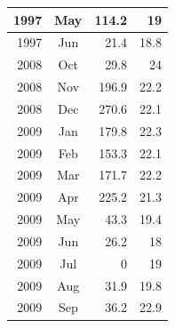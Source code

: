 \documentclass[11pt]{article}
\begin{document}
\begin{table}[]
{\begin{tabular}{|r|c|r|r|}
1997 & May & 114.2 & 19 \\ \hline
1997 & Jun & 21.4 & 18.8 \\ \hline
2008 & Oct & 29.8 & 24 \\ \hline
2008 & Nov & 196.9 & 22.2 \\ \hline
2008 & Dec & 270.6 & 22.1 \\ \hline
2009 & Jan & 179.8 & 22.3 \\ \hline
2009 & Feb & 153.3 & 22.1 \\ \hline
2009 & Mar & 171.7 & 22.2 \\ \hline
2009 & Apr & 225.2 & 21.3 \\ \hline
2009 & May & 43.3 & 19.4 \\ \hline
2009 & Jun & 26.2 & 18 \\ \hline
2009 & Jul & 0 & 19 \\ \hline
2009 & Aug & 31.9 & 19.8 \\ \hline
2009 & Sep & 36.2 & 22.9 \\ \hline
\end{tabular}%
}
\end{table}

\end{document}
